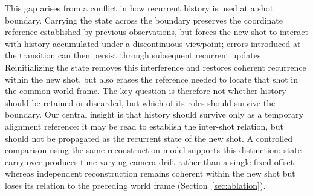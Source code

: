 This gap arises from a conflict in how recurrent history is used at a shot
boundary. Carrying the state across the boundary preserves the coordinate
reference established by previous observations, but forces the new shot to
interact with history accumulated under a discontinuous viewpoint; errors
introduced at the transition can then persist through subsequent recurrent
updates. Reinitializing the state removes this interference and restores
coherent recurrence within the new shot, but also erases the reference needed
to locate that shot in the common world frame. The key question is therefore
not whether history should be retained or discarded, but which of its roles
should survive the boundary. Our central insight is that history should
survive only as a temporary alignment reference: it may be read to establish
the inter-shot relation, but should not be propagated as the recurrent state
of the new shot. A controlled comparison using the same reconstruction model
supports this distinction: state carry-over produces time-varying camera
drift rather than a single fixed offset, whereas independent reconstruction
remains coherent within the new shot but loses its relation to the preceding
world frame (Section~\ref{sec:ablation}).

